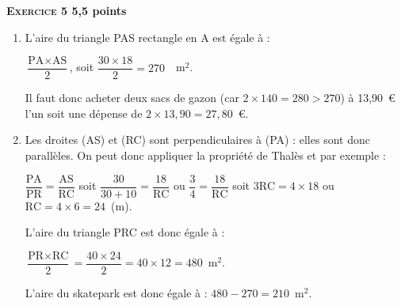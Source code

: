\textbf{\textsc{Exercice 5} \hfill 5,5 points}

%
%
%
%
%
%
%

\begin{enumerate}
\item %

L'aire du  triangle PAS rectangle en A est égale à :

$\dfrac{\text{PA} \times  \text{AS}}{2}$, soit $\dfrac{30 \times 18}{2} = 270$~~m$^2$.

Il faut donc acheter deux sacs de gazon (car $2 \times 140 = 280 > 270$) à 13,90~\euro{} l'un soit une dépense de $2\times 13,90 = 27,80$~\euro.
\item %
Les droites (AS) et (RC) sont perpendiculaires à (PA) : elles sont donc parallèles. On peut donc appliquer la propriété de Thalès et par exemple :

$\dfrac{\text{PA}}{\text{PR}} =  \dfrac{\text{AS}}{\text{RC}}$ soit $\dfrac{30}{30+10} =  \dfrac{18}{\text{RC}}$ ou $\dfrac{3}{4} = \dfrac{18}{\text{RC}}$ soit $3\text{RC} = 4 \times 18$ ou $\text{RC} = 4 \times 6 = 24$~(m).

L'aire du triangle PRC est donc égale à :

$\dfrac{\text{PR}\times \text{RC}}{2} = \dfrac{40 \times 24}{2} = 40 \times 12 = 480$~m$^2$.

L'aire du \og skatepark \fg{} est donc égale à : $480 - 270 = 210$~m$^2$.
\end{enumerate}

\bigskip

